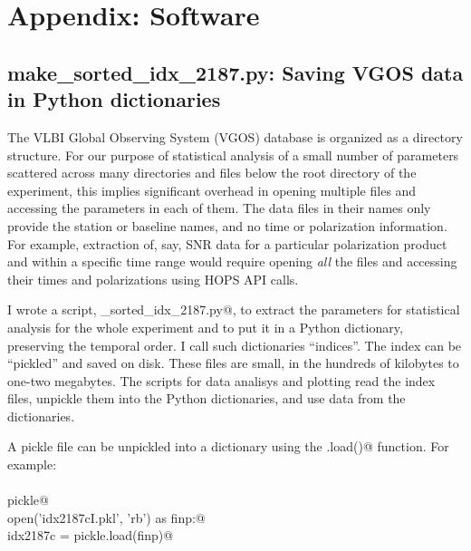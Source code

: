 \documentclass[letterpaper,twoside,12pt]{article}
\begin{document}
\cleardoublepage

\section{Appendix: Software}

\subsection{make\_sorted\_idx\_2187.py: Saving VGOS data in Python dictionaries}

The VLBI Global Observing System (VGOS) database is organized as a directory structure. For our purpose of statistical analysis of a small number of parameters scattered across many directories and files below the root directory of the experiment, this implies significant overhead in opening multiple files and accessing the parameters in each of them. The data files in their names only provide the station or baseline names, and no time or polarization information. For example, extraction of, say, SNR data for a particular polarization product and within a specific time range would require opening \emph{all} the files and accessing their times and polarizations using HOPS API calls.

I wrote a script, \verb@make_sorted_idx_2187.py@, to extract the parameters for statistical analysis for the whole experiment and to put it in a Python dictionary, preserving the temporal order. I call such dictionaries ``indices''. The index can be ``pickled'' and saved on disk. These files are small, in the hundreds of kilobytes to one-two megabytes.  The scripts for data analisys and plotting read the index files, unpickle them into the Python dictionaries, and use data from the dictionaries.

A pickle file can be unpickled into a  dictionary using the \verb@pickle.load()@ function. For example: \\ \\
\noindent \verb@import pickle@ \\
\noindent \verb@with open('idx2187cI.pkl', 'rb') as finp:@ \\
\noindent \verb@    idx2187c = pickle.load(finp)@ \\ \\
\end{document}
